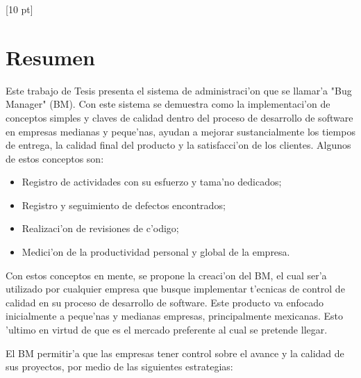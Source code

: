 \titleformat{\chapter}{\Huge\bfseries}{\thechapter}{0 pt}{\rule{340 pt}{3 pt}\\}
\titlespacing{\chapter}{100 pt}{-25 pt}{40 pt}[10 pt]	
\pagestyle{fancy}
\fancyhead[RO,RE]{\thepage}
\fancyfoot[CO,CE]{}

\chapter*{Resumen}


\normalsize
\noindent Este trabajo de Tesis presenta el sistema de administraci'on que se llamar'a "Bug Manager" (BM). Con este sistema se demuestra como la implementaci'on de conceptos simples y claves de calidad dentro del proceso de desarrollo de software en empresas medianas y peque'nas, ayudan a mejorar sustancialmente los tiempos de entrega, la calidad final del producto y la satisfacci'on de los clientes. Algunos de estos conceptos son:

\begin{itemize}
	\item Registro de actividades con su esfuerzo y tama'no dedicados;
	\item Registro y seguimiento de defectos encontrados;
	\item Realizaci'on de revisiones de c'odigo;
	\item Medici'on de la productividad personal y global de la empresa.
\end{itemize}

Con estos conceptos en mente, se propone la creaci'on del BM, el cual ser'a utilizado por cualquier empresa que busque implementar t'ecnicas de control de calidad en su proceso de desarrollo de software. Este producto va enfocado inicialmente a peque'nas y medianas empresas, principalmente mexicanas. Esto 'ultimo en virtud de que es el mercado preferente al cual se pretende llegar.

El BM permitir'a que las empresas tener control sobre el avance y la calidad de sus proyectos, por medio de las siguientes estrategias:

